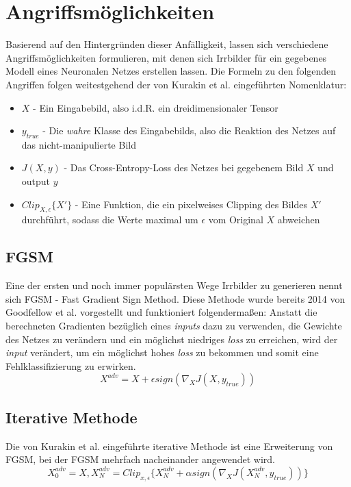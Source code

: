 \section{Angriffsmöglichkeiten}
Basierend auf den Hintergründen dieser Anfälligkeit, lassen sich verschiedene Angriffsmöglichkeiten formulieren, mit denen sich Irrbilder für ein gegebenes Modell eines Neuronalen Netzes erstellen lassen.
Die Formeln zu den folgenden Angriffen folgen weitestgehend der von Kurakin et al. \cite{kurakin2016adversarial} eingeführten Nomenklatur:
\begin{itemize}
	\item \(X\) - Ein Eingabebild, also i.d.R. ein dreidimensionaler Tensor
	\item \(y_{true} \) - Die \textit{wahre} Klasse des Eingabebilds, also die Reaktion des Netzes auf das nicht-manipulierte Bild
	\item \(J(X,y)\) - Das Cross-Entropy-Loss des Netzes bei gegebenem Bild \(X\) und output \(y\) 
	\item \(Clip_{X,\epsilon}\{X'\} \) - Eine Funktion, die ein pixelweises Clipping des Bildes \(X'\) durchführt, sodass die Werte maximal um \(\epsilon\) vom Original \(X\) abweichen
\end{itemize}



\subsection{FGSM}
Eine der ersten und noch immer populärsten Wege Irrbilder zu generieren nennt sich FGSM - Fast Gradient Sign Method. Diese Methode wurde bereits 2014 von Goodfellow et al. vorgestellt und funktioniert folgendermaßen:
Anstatt die berechneten Gradienten bezüglich eines \textit{inputs} dazu zu verwenden, die Gewichte des Netzes zu verändern und ein möglichst niedriges \textit{loss} zu erreichen, wird der \textit{input} verändert, um ein möglichst hohes \textit{loss} zu bekommen und somit eine Fehlklassifizierung zu erwirken.
\begin{equation}
X^{adv} = X + \epsilon sign(\nabla_{X} J(X, y_{true}))
\end{equation}


\subsection{Iterative Methode}
Die von Kurakin et al. \cite{kurakin2016adversarial} eingeführte iterative Methode ist eine Erweiterung von FGSM, bei der FGSM mehrfach nacheinander angewendet wird.
\begin{equation}
X_0^{adv} = X, X_N^{adv} = Clip_{x, \epsilon} \{X_N^{adv} +\alpha sign(\nabla_X J(X_N^{adv}, y_{true})) \}
\end{equation}

